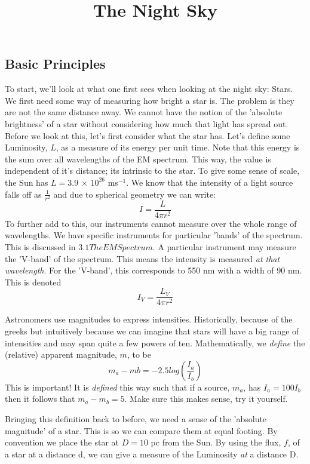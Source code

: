 \subsection{Basic Principles}
\title{The Night Sky}
To start, we'll look at what one first sees when looking at the night sky: Stars. We first need some way of measuring how bright a star is. The problem is they are not the same distance away. We cannot have the notion of the 'absolute brightness' of a star without considering how much that light has spread out. Before we look at this, let's first consider what the star has. Let's define some Luminosity, $L$, as a measure of its energy per unit time. Note that this energy is the sum over all wavelengths of the EM spectrum. This way, the value is independent of it's distance; its intrinsic to the star. To give some sense of scale, the Sun has $L=3.9$ $\times$ $10^{26}$ ms${}^{-1}$. We know that the intensity of a light source falls off as $\frac{1}{r^{2}}$ and due to spherical geometry we can write:
\begin{equation}
I = \frac{L}{4\pi r^{2}}
\end{equation}
To further add to this, our instruments cannot measure over the whole range of wavelengths. We have specific instruments for particular 'bands' of the spectrum. This is discussed in $3.1 The EM Spectrum$. A particular instrument may measure the 'V-band' of the spectrum. This means the intensity is measured \textit{at that wavelength}. For the 'V-band', this corresponds to 550 nm with a width of 90 nm. This is denoted
\begin{equation}
I_{V} = \frac{L_{V}}{4 \pi r^{2}}
\end{equation}
\par
Astronomers use magnitudes to express intensities. Historically, because of the greeks but intuitively because we can imagine that stars will have a big range of intensities and may span quite a few powers of ten. Mathematically, we \textit{define} the (relative) apparent magnitude, $m$, to be
\begin{equation}
m_{a} - m{b} = -2.5log(\frac{I_{a}}{I_{b}})
\end{equation}
This is important! It is \textit{defined} this way such that if a source, $m_{a}$, has $I_{a} = 100I_{b}$ then it follows that $m_{a} - m_{b} = 5$. Make sure this makes sense, try it yourself. \par
Bringing this definition back to before, we need a sense of the 'absolute magnitude' of a star. This is so we can compare them at equal footing. By convention we place the star at $D=10$ pc from the Sun. By using the flux, $f$, of a star at a distance d, we can give a measure of the Luminosity \textit{at} a distance D. 
